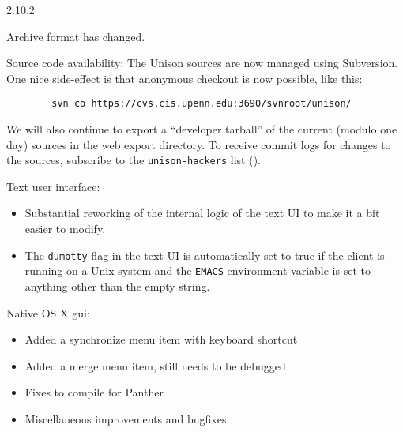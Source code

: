 \begin{changesfromversion}{2.10.2}
\item \incompatible{} Archive format has changed.  

\item Source code availability: The Unison sources are now managed using
  Subversion.  One nice side-effect is that anonymous checkout is now
  possible, like this:
\begin{verbatim}
        svn co https://cvs.cis.upenn.edu:3690/svnroot/unison/
\end{verbatim}
We will also continue to export a ``developer tarball'' of the current
(modulo one day) sources in the web export directory.  To receive commit logs
for changes to the sources, subscribe to the \verb|unison-hackers| list
(). 

\item Text user interface:
\begin{itemize}
\item Substantial reworking of the internal logic of the text UI to make it
a bit easier to modify.
\item The {\tt dumbtty} flag in the text UI is automatically set to true if
the client is running on a Unix system and the {\tt EMACS} environment
variable is set to anything other than the empty string.
\end{itemize}

\item Native OS X gui:
\begin{itemize}
\item Added a synchronize menu item with keyboard shortcut
\item Added a merge menu item, still needs to be debugged
\item Fixes to compile for Panther
\item Miscellaneous improvements and bugfixes
\end{itemize}


\end{changesfromversion}
